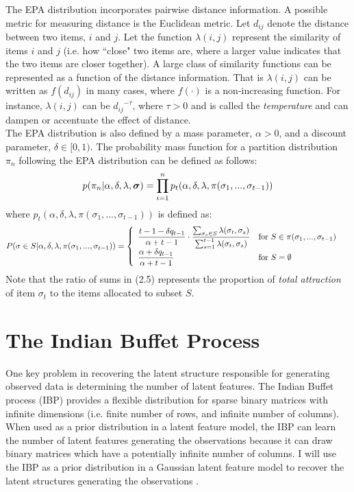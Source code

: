 \noindent
The EPA distribution incorporates pairwise distance information. A possible
metric for measuring distance is the Euclidean metric. Let $d_{ij}$ denote the
distance between two items, $i$ and $j$. Let the function $\lambda(i,j)$ represent
the similarity of items $i$ and $j$ (i.e. how ``close" two items are, where a larger
value indicates that the two items are closer together). A large class of similarity
functions can be represented as a function of the distance information. That is
$\lambda(i,j)$ can be written as $f(d_{ij})$ in many cases, where $f(\cdot)$ is a
non-increasing function. For instance, $\lambda(i,j)$ can be ${d_{ij}}^{-\tau}$,
where $\tau>0$ and is called the \textit{temperature} and can dampen or
accentuate the effect of distance.\\

\noindent
The EPA distribution is also defined by a mass parameter, $\alpha > 0$, and a
discount parameter, $\delta \in [0,1)$. The probability mass function for a
partition distribution $\pi_n$ following the EPA distribution can be defined as
follows:
\begin{equation}
  p(\pi_n|\alpha,\delta,\lambda,\bm\sigma)=
    \prod\limits_{i=1}^{n}p_t(\alpha,\delta,\lambda,\pi(\sigma_1,...,\sigma_{t-1}))
\end{equation}
where $p_t(\alpha,\delta,\lambda,\pi(\sigma_1,...,\sigma_{t-1}))$ is defined as:
\begin{equation}
  P(\sigma \in S | \alpha,\delta,\lambda,\pi(\sigma_1,...,\sigma_{t-1}))=
  \begin{cases}
    \begin{array}{ll}
      \displaystyle\frac{t-1-\delta q_{t-1}}{\alpha+t-1} \cdot 
        \frac{\sum_{\sigma_s \in S}\lambda(\sigma_t,\sigma_s)}
        {\sum_{s=1}^{t-1}\lambda(\sigma_t,\sigma_s)} & 
        \text{for }S \in \pi(\sigma_1,...,\sigma_{t-1})\\
      \displaystyle\frac{\alpha+\delta q_{t-1}}{\alpha+t-1} &  \text{for }S  = \emptyset \\
    \end{array}
  \end{cases}
\end{equation}
Note that the ratio of sums in (2.5) represents the proportion of \textit{total
attraction} of item $\sigma_t$ to the items allocated to subset $S$.


\section{The Indian Buffet Process}
One key problem in recovering the latent structure responsible for generating
observed data is determining the number of latent features. The Indian Buffet
process (IBP) provides a flexible distribution for sparse binary matrices with
infinite dimensions (i.e. finite number of rows, and infinite number of columns).
When used as a prior distribution in a latent feature model, the IBP can
learn the number of latent features generating the observations because it can
draw binary matrices which have a potentially infinite number of columns. I will
use the IBP as a prior distribution in a Gaussian latent feature model to
recover the latent structures generating the observations \cite{ibp}.\\

